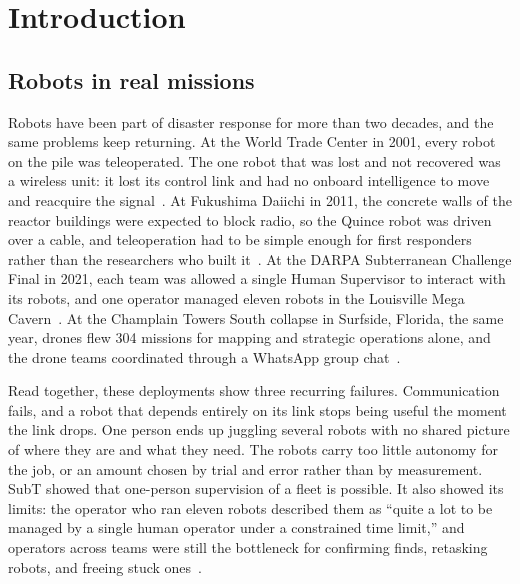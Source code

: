 
\chapter*{Introduction}
\label{ch:introduction}

\section*{Robots in real missions}

Robots have been part of disaster response for more than two decades, and the same problems keep returning.
At the World Trade Center in 2001, every robot on the pile was teleoperated.
The one robot that was lost and not recovered was a wireless unit: it lost its control link and had no onboard intelligence to move and reacquire the signal~\citep{murphy2004rescue}.
At Fukushima Daiichi in 2011, the concrete walls of the reactor buildings were expected to block radio, so the Quince robot was driven over a cable, and teleoperation had to be simple enough for first responders rather than the researchers who built it~\citep{nagatani2011fukushima}.
At the DARPA Subterranean Challenge Final in 2021, each team was allowed a single Human Supervisor to interact with its robots, and one operator managed eleven robots in the Louisville Mega Cavern~\citep{darpa2021subt,ackerman2021subtoperators}.
At the Champlain Towers South collapse in Surfside, Florida, the same year, drones flew 304 missions for mapping and strategic operations alone, and the drone teams coordinated through a WhatsApp group chat~\citep{murphy2021surfside}.

Read together, these deployments show three recurring failures.
Communication fails, and a robot that depends entirely on its link stops being useful the moment the link drops.
One person ends up juggling several robots with no shared picture of where they are and what they need.
The robots carry too little autonomy for the job, or an amount chosen by trial and error rather than by measurement.
SubT showed that one-person supervision of a fleet is possible.
It also showed its limits: the operator who ran eleven robots described them as ``quite a lot to be managed by a single human operator under a constrained time limit,'' and operators across teams were still the bottleneck for confirming finds, retasking robots, and freeing stuck ones~\citep{ackerman2021subtoperators}.

